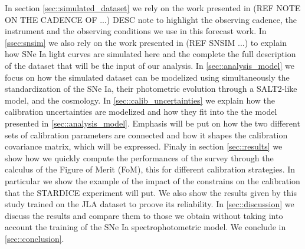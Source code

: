 \documentclass[\docopts]{\docclass}
\begin{document}
In section \ref{sec::simulated_dataset} we rely on the work presented in (REF NOTE ON THE CADENCE OF ...) DESC note to highlight the observing cadence, the instrument and the observing conditions we use in this forecast work.
In \ref{ssec:snsim} we also rely on the work presented in (REF SNSIM ...) to explain how SNe Ia light curves are simulated here and the complete the full description of the dataset that will be the input of our analysis.
In \ref{sec::analysis_model} we focus on how the simulated dataset can be modelized using simultaneously the standardization of the SNe Ia, their photometric evolution through a SALT2-like model, and the cosmology.
In \ref{sec::calib_uncertainties} we explain how the calibration uncertainties are modelized and how they fit into the the model presented in \ref{sec::analysis_model}.
Emphasis will be put on how the two different sets of calibration parameters are connected and how it shapes the calibration covariance matrix, which will be expressed.
Finaly in section \ref{sec::results} we show how we quickly compute the performances of the survey through the calculus of the Figure of Merit (FoM), this for different calibration strategies.
In particular we show the example of the impact of the constrains on the calibration that the STARDICE experiment will put.
We also show the results given by this study trained on the JLA dataset to proove its reliability.
In \ref{sec::discussion} we discuss the results and compare them to those we obtain without taking into account the training of the SNe Ia spectrophotometric model.
We conclude in \ref{sec::conclusion}.


\end{document}
